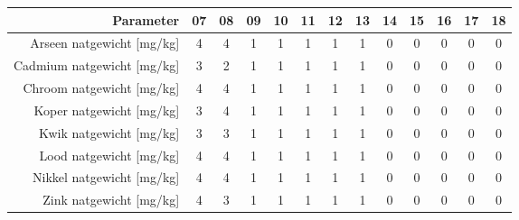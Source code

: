 \begin{tabular}{ r |c | c | c | c | c |c | c | c | c | c | c | c } 
\rowcolor[HTML]{EFEFEF}  
 Parameter & 07 & 08 & 09 & 10 & 11 & 12 & 13 & 14 & 15 & 16 & 17 & 18 \\    \hline     
Arseen natgewicht [mg/kg] &4 & 4 & 1 & 1 & 1 & 1 & 1 & 0 & 0 & 0 & 0 & 0 \\
Cadmium natgewicht [mg/kg] &3 & 2 & 1 & 1 & 1 & 1 & 1 & 0 & 0 & 0 & 0 & 0 \\
Chroom natgewicht [mg/kg] &4 & 4 & 1 & 1 & 1 & 1 & 1 & 0 & 0 & 0 & 0 & 0 \\
Koper natgewicht [mg/kg] &3 & 4 & 1 & 1 & 1 & 1 & 1 & 0 & 0 & 0 & 0 & 0 \\
Kwik natgewicht [mg/kg] &3 & 3 & 1 & 1 & 1 & 1 & 1 & 0 & 0 & 0 & 0 & 0 \\
Lood natgewicht [mg/kg] &4 & 4 & 1 & 1 & 1 & 1 & 1 & 0 & 0 & 0 & 0 & 0 \\
Nikkel natgewicht [mg/kg] &4 & 4 & 1 & 1 & 1 & 1 & 1 & 0 & 0 & 0 & 0 & 0 \\
Zink natgewicht [mg/kg] &4 & 3 & 1 & 1 & 1 & 1 & 1 & 0 & 0 & 0 & 0 & 0 \\
\end{tabular}    
